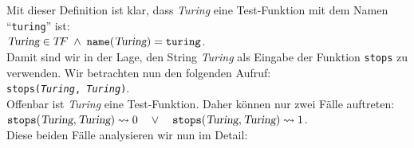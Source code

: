 Mit dieser Definition ist klar, dass \textsl{Turing} eine Test-Funktion mit dem Namen
``\texttt{turing}'' ist: \\[0.3cm]
\hspace*{1.3cm} $\textsl{Turing} \in T\!F \;\wedge\; \mathtt{name}(\textsl{Turing}) = \mathtt{turing}$. \\[0.3cm]
Damit sind wir in der Lage, den String \textsl{Turing} als Eingabe der Funktion \texttt{stops}
zu verwenden.  Wir betrachten nun den folgenden Aufruf: \\[0.3cm]
\hspace*{1.3cm} \texttt{stops(\textsl{Turing}, \textsl{Turing})}. \\[0.3cm]
Offenbar ist \textsl{Turing} eine Test-Funktion.  Daher k\"onnen nur zwei F\"alle auftreten:
\\[0.1cm]
\hspace*{1.3cm} 
$\mathtt{stops}(\textsl{Turing}, \textsl{Turing}) \leadsto 0 \quad \vee\quad
 \mathtt{stops}(\textsl{Turing}, \textsl{Turing}) \leadsto 1$. \\[0.1cm]
Diese beiden F\"alle analysieren wir nun im Detail:
